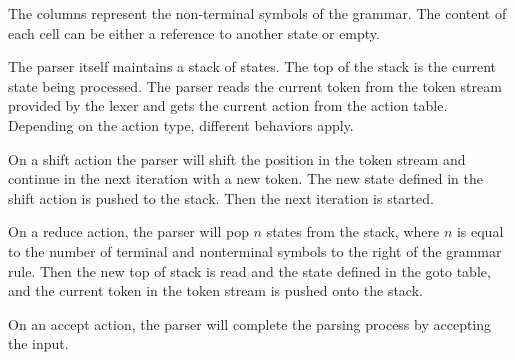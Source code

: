 The columns represent the non-terminal symbols of the grammar. 
The content of each cell can be either a reference to another state or empty.

The parser itself maintains a stack of states. 
The top of the stack is the current state being processed. 
The parser reads the current token from the token stream provided by the lexer and gets the current action from the action table.
Depending on the action type, different behaviors apply.

On a shift action the parser will shift the position in the token stream and continue in the next iteration with a new token. 
The new state defined in the shift action is pushed to the stack. Then the next iteration is started.

On a reduce action, the parser will pop $n$ states from the stack, where $n$ is equal to the number of terminal and nonterminal 
symbols to the right of the grammar rule. Then the new top of stack is read and the state defined in the goto 
table, and the current token in the token stream is pushed onto the stack.

On an accept action, the parser will complete the parsing process by accepting the input. 
